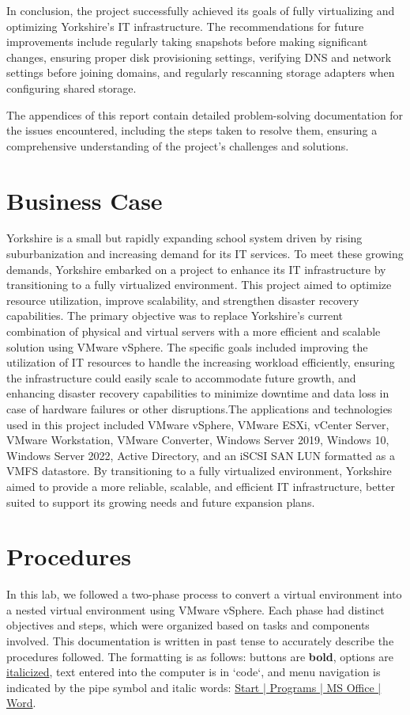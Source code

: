 \documentclass[letterpaper,12pt]{article}
\begin{document}
In conclusion, the project successfully achieved its goals of fully virtualizing and optimizing Yorkshire's IT infrastructure. The recommendations for future improvements include regularly taking snapshots before making significant changes, ensuring proper disk provisioning settings, verifying DNS and network settings before joining domains, and regularly rescanning storage adapters when configuring shared storage.

The appendices of this report contain detailed problem-solving documentation for the issues encountered, including the steps taken to resolve them, ensuring a comprehensive understanding of the project's challenges and solutions.
\section{Business Case}
\label{sec:org6580645}
Yorkshire is a small but rapidly expanding school system driven by rising suburbanization and increasing demand for its IT services. To meet these growing demands, Yorkshire embarked on a project to enhance its IT infrastructure by transitioning to a fully virtualized environment. This project aimed to optimize resource utilization, improve scalability, and strengthen disaster recovery capabilities. The primary objective was to replace Yorkshire's current combination of physical and virtual servers with a more efficient and scalable solution using VMware vSphere. The specific goals included improving the utilization of IT resources to handle the increasing workload efficiently, ensuring the infrastructure could easily scale to accommodate future growth, and enhancing disaster recovery capabilities to minimize downtime and data loss in case of hardware failures or other disruptions.The applications and technologies used in this project included VMware vSphere, VMware ESXi, vCenter Server, VMware Workstation, VMware Converter, Windows Server 2019, Windows 10, Windows Server 2022, Active Directory, and an iSCSI SAN LUN formatted as a VMFS datastore. By transitioning to a fully virtualized environment, Yorkshire aimed to provide a more reliable, scalable, and efficient IT infrastructure, better suited to support its growing needs and future expansion plans.
\section{Procedures}
\label{sec:org9b8cc32}

In this lab, we followed a two-phase process to convert a virtual environment into a nested virtual environment using VMware vSphere. Each phase had distinct objectives and steps, which were organized based on tasks and components involved. This documentation is written in past tense to accurately describe the procedures followed. The formatting is as follows: buttons are \textbf{bold}, options are \uline{italicized}, text entered into the computer is in `code`, and menu navigation is indicated by the pipe symbol and italic words: \uline{Start | Programs | MS Office | Word}.
\end{document}

